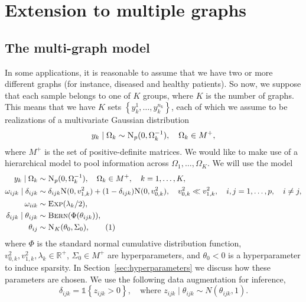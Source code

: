 \documentclass[a4paper, 11pt, oneside]{report}
\newcommand{\1}{\mathds{1}}
\newcommand{\inv}{^{-1}}
\newcommand{\Np}{\textsc{N}_p}
\newcommand{\Nor}{\textsc{N}}
\newcommand{\Bern}{\textsc{Bern}}
\newcommand{\Exp}{\textsc{Exp}}
\begin{document}
\chapter{Extension to multiple graphs}\label{chap:multigraph}
\section{The multi-graph model}
In some applications, it is reasonable to assume that we have two or more different graphs (for instance, diseased and healthy patients).
So now, we suppose that each sample belongs to one of $K$ groups, where $K$ is the number of graphs.
This means that we have $K$ sets $\left\{y_k^1, \dots, y_k^{n_k}\right\}$, each of which we assume to be realizations of a multivariate Gaussian distribution \[y_k \mid \Omega_k \sim \Np(0, \Omega_k\inv), \quad \Omega_k \in M^+,\] where $M^+$ is the set of positive-definite matrices.
We would like to make use of a hierarchical model to pool information across $\Omega_1,\dots,\Omega_K$.
We will use the model
\begin{align*}
	y_k \mid \Omega_k              & \sim \Np(0, \Omega_k^{-1}),\quad \Omega_k \in M^+, \quad k=1,\dots,K,                                                                               \\
	\omega_{ijk} \mid \delta_{ijk} & \sim \delta_{ijk} \Nor(0, v_{1,k}^2) + (1 - \delta_{ijk}) \Nor(0, v_{0,k}^2),  \quad v_{0,k}^2 \ll v_{1,k}^2, \quad i,j = 1,\dots,p,\quad i \neq j, \\
	\omega_{iik}                   & \sim \Exp(\lambda_k/2),                                                                                                                             \\
	\delta_{ijk} \mid \theta_{ijk} & \sim \Bern(\Phi(\theta_{ijk})),                                                                                                                     \\
	\theta_{ij}                    & \sim \textsc{N}_K(\theta_0, \Sigma_0),\stepcounter{equation}\tag{\theequation}\label{eq:mg-model}
\end{align*}
where $\Phi$ is the standard normal cumulative distribution function, $v_{0,k}^2,
	v_{1,k}^2, \lambda_k \in \mathbb{R}^+$, $\Sigma_0 \in M^+$ are hyperparameters, and $\theta_0 < 0$ is a hyperparameter to induce sparsity.
In Section~\ref{sec:hyperparameters} we discuss how these parameters are chosen.
We use the following data augmentation for inference,
\[\delta_{ijk} = \1\left\{z_{ijk} > 0\right\}, \quad \text{where } z_{ijk} \mid \theta_{ijk} \sim N\left(\theta_{ijk}, 1\right).\]
\end{document}
